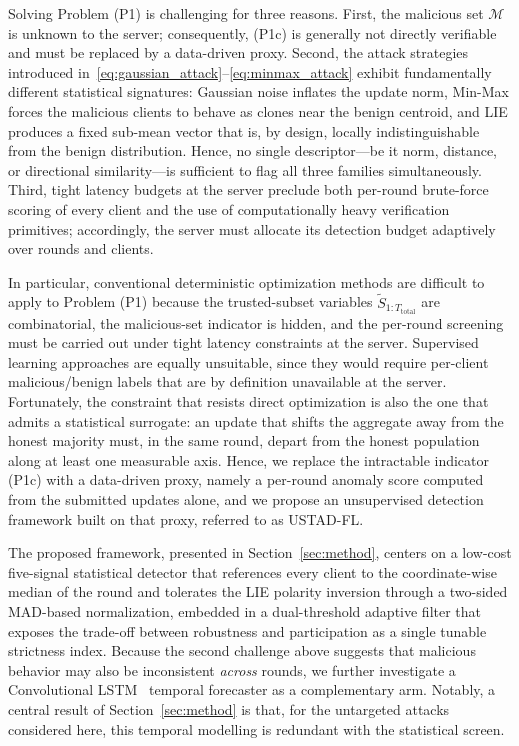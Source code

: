 \documentclass[journal]{IEEEtran}
\begin{document}
Solving Problem (P1) is challenging for three reasons. First, the malicious set $\mathcal{M}$ is unknown to the server; consequently, (P1c) is generally not directly verifiable and must be replaced by a data-driven proxy. Second, the attack strategies introduced in~\eqref{eq:gaussian_attack}--\eqref{eq:minmax_attack} exhibit fundamentally different statistical signatures: Gaussian noise inflates the update norm, Min-Max forces the malicious clients to behave as clones near the benign centroid, and LIE produces a fixed sub-mean vector that is, by design, locally indistinguishable from the benign distribution. Hence, no single descriptor—be it norm, distance, or directional similarity—is sufficient to flag all three families simultaneously. Third, tight latency budgets at the server preclude both per-round brute-force scoring of every client and the use of computationally heavy verification primitives; accordingly, the server must allocate its detection budget adaptively over rounds and clients.

In particular, conventional deterministic optimization methods are difficult to apply to Problem (P1) because the trusted-subset variables $\widetilde{S}_{1:T_{\text{total}}}$ are combinatorial, the malicious-set indicator is hidden, and the per-round screening must be carried out under tight latency constraints at the server. Supervised learning approaches are equally unsuitable, since they would require per-client malicious/benign labels that are by definition unavailable at the server. Fortunately, the constraint that resists direct optimization is also the one that admits a statistical surrogate: an update that shifts the aggregate away from the honest majority must, in the same round, depart from the honest population along at least one measurable axis. Hence, we replace the intractable indicator (P1c) with a data-driven proxy, namely a per-round anomaly score computed from the submitted updates alone, and we propose an unsupervised detection framework built on that proxy, referred to as USTAD-FL.

The proposed framework, presented in Section~\ref{sec:method}, centers on a low-cost five-signal statistical detector that references every client to the coordinate-wise median of the round and tolerates the LIE polarity inversion through a two-sided MAD-based normalization, embedded in a dual-threshold adaptive filter that exposes the trade-off between robustness and participation as a single tunable strictness index. Because the second challenge above suggests that malicious behavior may also be inconsistent \emph{across} rounds, we further investigate a Convolutional LSTM~\cite{shi2015convolutional} temporal forecaster as a complementary arm. Notably, a central result of Section~\ref{sec:method} is that, for the untargeted attacks considered here, this temporal modelling is redundant with the statistical screen.
\end{document}
